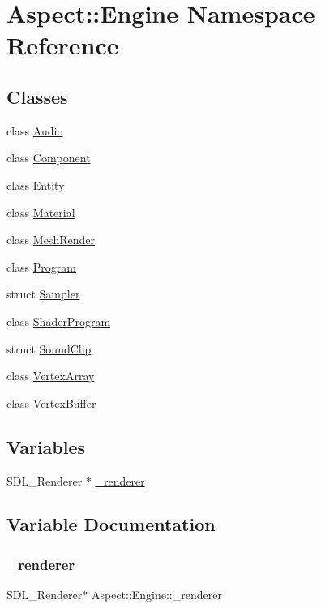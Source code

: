 \hypertarget{namespace_aspect_1_1_engine}{}\section{Aspect\+:\+:Engine Namespace Reference}
\label{namespace_aspect_1_1_engine}
\subsection*{Classes}
\begin{DoxyCompactItemize}
\item 
class \mbox{\hyperlink{class_aspect_1_1_engine_1_1_audio}{Audio}}
\item 
class \mbox{\hyperlink{class_aspect_1_1_engine_1_1_component}{Component}}
\item 
class \mbox{\hyperlink{class_aspect_1_1_engine_1_1_entity}{Entity}}
\item 
class \mbox{\hyperlink{class_aspect_1_1_engine_1_1_material}{Material}}
\item 
class \mbox{\hyperlink{class_aspect_1_1_engine_1_1_mesh_render}{Mesh\+Render}}
\item 
class \mbox{\hyperlink{class_aspect_1_1_engine_1_1_program}{Program}}
\item 
struct \mbox{\hyperlink{struct_aspect_1_1_engine_1_1_sampler}{Sampler}}
\item 
class \mbox{\hyperlink{class_aspect_1_1_engine_1_1_shader_program}{Shader\+Program}}
\item 
struct \mbox{\hyperlink{struct_aspect_1_1_engine_1_1_sound_clip}{Sound\+Clip}}
\item 
class \mbox{\hyperlink{class_aspect_1_1_engine_1_1_vertex_array}{Vertex\+Array}}
\item 
class \mbox{\hyperlink{class_aspect_1_1_engine_1_1_vertex_buffer}{Vertex\+Buffer}}
\end{DoxyCompactItemize}
\subsection*{Variables}
\begin{DoxyCompactItemize}
\item 
S\+D\+L\+\_\+\+Renderer $\ast$ \mbox{\hyperlink{namespace_aspect_1_1_engine_a2e77b2fdf7d09e5d3f7bd282fce342a2}{\+\_\+renderer}}
\end{DoxyCompactItemize}


\subsection{Variable Documentation}
\mbox{\label{namespace_aspect_1_1_engine_a2e77b2fdf7d09e5d3f7bd282fce342a2}} 
\subsubsection{\texorpdfstring{\+\_\+renderer}{\_renderer}}
{\footnotesize\ttfamily S\+D\+L\+\_\+\+Renderer$\ast$ Aspect\+::\+Engine\+::\+\_\+renderer}

